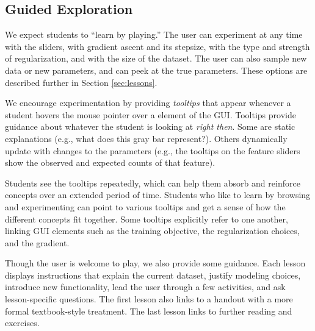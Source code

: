 \documentclass[11pt,letterpaper]{article}
\begin{document}
\subsection{Guided Exploration}

We expect students to ``learn by playing.''  The user can experiment
at any time with the sliders, with gradient ascent and its stepsize,
with the type and strength of regularization, and with the size of the
dataset.  The user can also sample new data or new parameters, and can
peek at the true parameters.  These options are described further
in Section \ref{sec:lessons}.


We encourage experimentation by providing \textit{tooltips} that
appear whenever a student hovers the mouse pointer over a element of
the GUI.  Tooltips provide guidance about whatever the student is
looking at \textit{right then}.  Some are static explanations (e.g.,
what does this gray bar represent?).  Others dynamically update with
changes to the parameters (e.g., the tooltips on the feature sliders
show the observed and expected counts of that feature).

Students see the tooltips repeatedly, which can help them absorb and
reinforce concepts over an extended period of time.  Students who like
to learn by browsing and experimenting can point to various tooltips
and get a sense of how the different concepts fit together.  Some
tooltips explicitly refer to one another, linking GUI elements such as
the training objective, the regularization choices, and the gradient.


Though the user is welcome to play, we also provide some guidance.
Each lesson displays instructions that explain the current dataset,
justify modeling choices, introduce new functionality, lead the user
through a few activities, and ask lesson-specific questions.  The
first lesson also links to a handout with a more formal textbook-style
treatment.  The last lesson links to further reading and exercises.

\end{document}
